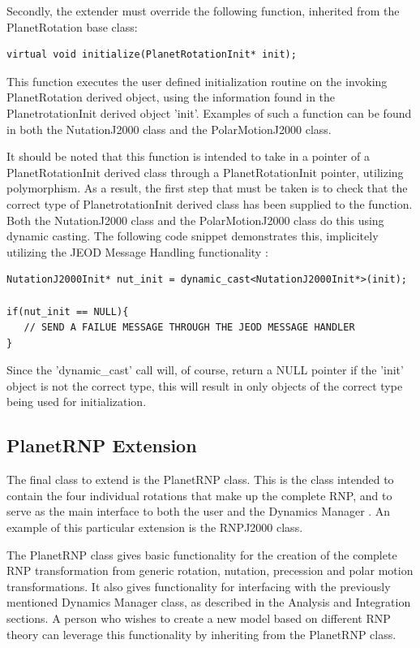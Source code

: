 Secondly, the extender must override the following function, inherited from the
PlanetRotation base class:

\begin{verbatim}
virtual void initialize(PlanetRotationInit* init);
\end{verbatim}

This function executes the user defined initialization routine on the
invoking PlanetRotation derived object, using the information found in the
PlanetrotationInit derived object 'init'. Examples of such a function can be
found in both the NutationJ2000 class and the PolarMotionJ2000 class.

It should be noted that this function is intended to take in a pointer of
a PlanetRotationInit derived class through a PlanetRotationInit pointer,
utilizing polymorphism. As a result, the first step that must be taken is
to check that the correct type of PlanetrotationInit derived class has been
supplied to the function. Both the NutationJ2000 class and the
PolarMotionJ2000 class do this using dynamic casting. The following
code snippet demonstrates this, implicitely utilizing the JEOD
Message Handling functionality \cite{dynenv:MESSAGE}:

\begin{verbatim}
NutationJ2000Init* nut_init = dynamic_cast<NutationJ2000Init*>(init);

if(nut_init == NULL){
   // SEND A FAILUE MESSAGE THROUGH THE JEOD MESSAGE HANDLER
}
\end{verbatim}

Since the 'dynamic\_cast' call will, of course, return a NULL pointer if the
'init' object is not the correct type, this will result in only objects
of the correct type being used for initialization.


\subsection{PlanetRNP Extension}

The final class to extend is the PlanetRNP class. This is the class intended
to contain the four individual rotations that make up the complete RNP,
and to serve as the main interface to both the user and the Dynamics
Manager \cite{dynenv:DYNMANAGER}. An example of this particular extension
is the RNPJ2000 class.

The PlanetRNP class gives basic functionality for the creation of the
complete RNP transformation from generic rotation, nutation, precession
and polar motion transformations. It also gives functionality for
interfacing with the previously mentioned Dynamics Manager class, as described
in the Analysis and Integration sections. A person who wishes to create
a new model based on different RNP theory can leverage this functionality by
inheriting from the PlanetRNP class.

